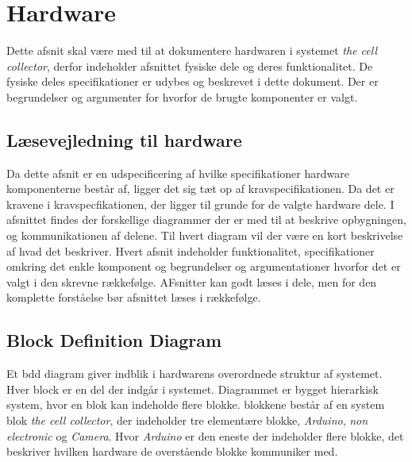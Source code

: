  \section{Hardware}
Dette afsnit skal være med til at dokumentere hardwaren i systemet \textit{the cell collector}, derfor indeholder afsnittet fysiske dele og deres funktionalitet. De fysiske deles specifikationer er udybes og beskrevet i dette dokument. Der er begrundelser og argumenter for hvorfor de brugte komponenter er valgt.

\subsection{Læsevejledning til hardware}
Da dette afsnit er en udspecificering af hvilke specifikationer hardware komponenterne består af, ligger det sig tæt op af kravspecifikationen. Da det er kravene i kravspecfikationen, der ligger til grunde for de valgte hardware dele. I afsnittet findes der forskellige diagrammer der er med til at beskrive opbygningen, og kommunikationen af delene. Til hvert diagram vil der være en kort beskrivelse af hvad det beskriver. Hvert afsnit indeholder funktionalitet, specifikationer omkring det enkle komponent og begrundelser og argumentationer hvorfor det er valgt i den skrevne rækkefølge. AFsnitter kan godt læses i dele, men for den komplette forståelse bør afsnittet læses i rækkefølge. 

 
 
 
 
 
 
 
 \newpage
\subsection{Block Definition Diagram} 
Et bdd diagram giver indblik i hardwarens overordnede struktur af systemet. Hver block er en del der indgår i systemet. Diagrammet er bygget hierarkisk system, hvor en blok kan indeholde flere blokke. blokkene består af en system blok \textit{the cell collector}, der indeholder tre elementære blokke, \textit{Arduino}, \textit{non electronic} og \textit{Camera}. Hvor \textit{Arduino} er den eneste der indeholder flere blokke, det beskriver hvilken hardware de overstående blokke kommuniker med.


